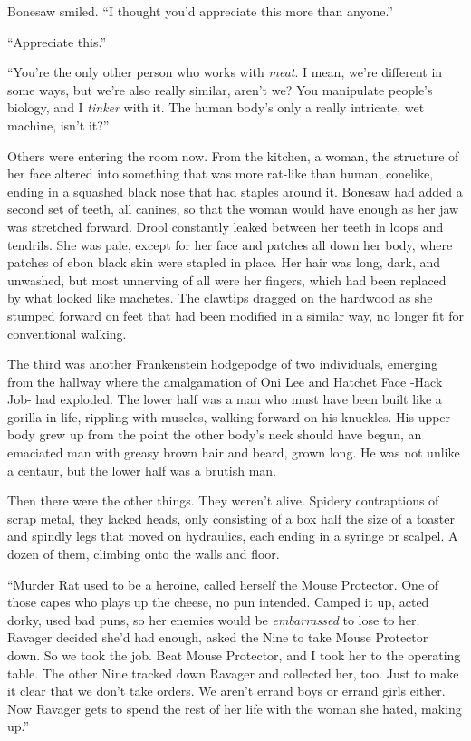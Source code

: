 Bonesaw smiled.  ``I thought you'd appreciate this more than anyone.''



``Appreciate this.''



``You're the only other person who works with \emph{meat}.  I mean, we're different in some ways, but we're also really similar, aren't we?  You manipulate people's biology, and I \emph{tinker} with it.  The human body's only a really intricate, wet machine, isn't it?''



Others were entering the room now.  From the kitchen, a woman, the structure of her face altered into something that was more rat-like than human, conelike, ending in a squashed black nose that had staples around it.  Bonesaw had added a second set of teeth, all canines, so that the woman would have enough as her jaw was stretched forward.  Drool constantly leaked between her teeth in loops and tendrils.  She was pale, except for her face and patches all down her body, where patches of ebon black skin were stapled in place.  Her hair was long, dark, and unwashed, but most unnerving of all were her fingers, which had been replaced by what looked like machetes.  The clawtips dragged on the hardwood as she stumped forward on feet that had been modified in a similar way, no longer fit for conventional walking.



The third was another Frankenstein hodgepodge of two individuals, emerging from the hallway where the amalgamation of Oni Lee and Hatchet Face -Hack Job- had exploded.  The lower half was a man who must have been built like a gorilla in life, rippling with muscles, walking forward on his knuckles.  His upper body grew up from the point the other body's neck should have begun, an emaciated man with greasy brown hair and beard, grown long.  He was not unlike a centaur, but the lower half was a brutish man.



Then there were the other things.  They weren't alive.  Spidery contraptions of scrap metal, they lacked heads, only consisting of a box half the size of a toaster and spindly legs that moved on hydraulics, each ending in a syringe or scalpel.  A dozen of them, climbing onto the walls and floor.



``Murder Rat used to be a heroine, called herself the Mouse Protector.  One of those capes who plays up the cheese, no pun intended.  Camped it up, acted dorky, used bad puns, so her enemies would be \emph{embarrassed} to lose to her.  Ravager decided she'd had enough, asked the Nine to take Mouse Protector down.  So we took the job.  Beat Mouse Protector, and I took her to the operating table.  The other Nine tracked down Ravager and collected her, too.  Just to make it clear that we don't take orders.  We aren't errand boys or errand girls either.  Now Ravager gets to spend the rest of her life with the woman she hated, making up.''



